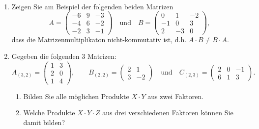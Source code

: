\begin{ejercicio}[Matrizenmultiplikation]~
    \begin{enumerate}
        \item Zeigen Sie am Beispiel der folgenden beiden Matrizen
        \begin{equation*}
            A = \begin{pmatrix}
                -6 & 9 & -3\\
                -4 & 6 & -2\\
                -2 & 3 & -1
            \end{pmatrix} \quad \text{und} \quad B = \begin{pmatrix}
                0 & 1 & -2\\
                -1 & 0 & 3\\
                2 & -3 & 0
            \end{pmatrix},
        \end{equation*}
        dass die Matrizenmultiplikaton nicht-kommutativ ist, d.h. $A \cdot B \neq B \cdot A$.
        \item Gegeben die folgenden 3 Matrizen:
        \begin{equation*}
            A_{(3,2)} = \begin{pmatrix}
                1 & 3\\
                2 & 0\\
                1 & 4
            \end{pmatrix},\qquad B_{(2,2)} = \begin{pmatrix}
                2 & 1\\
                3 & -2
            \end{pmatrix} \quad \text{und} \quad C_{(2,3)} = \begin{pmatrix}
                2 & 0 & -1\\
                6 & 1 & 3
            \end{pmatrix}.
        \end{equation*}
        \begin{enumerate}
            \item Bilden Sie alle möglichen Produkte $X\cdot Y$ aus zwei Faktoren.
            \item Welche Produkte $X\cdot Y\cdot Z$ aus drei verschiedenen Faktoren können Sie damit bilden?
        \end{enumerate}
    \end{enumerate}
\end{ejercicio}


